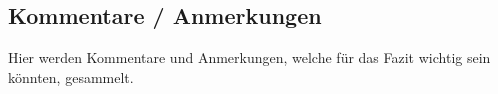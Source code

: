 
\begin{landscape}
    \section{Kommentare / Anmerkungen}
    \begin{flushleft}
        Hier werden Kommentare und Anmerkungen, welche für das Fazit wichtig sein könnten, gesammelt.
        
    \end{flushleft}
\end{landscape}